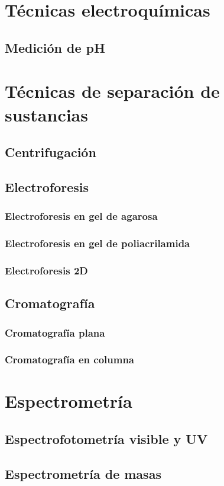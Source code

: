 \chapter{Técnicas electroquímicas}
\section{Medición de pH}
\chapter{Técnicas de separación de sustancias}
\section{Centrifugación}
\section{Electroforesis}
\subsection{Electroforesis en gel de agarosa}
\subsection{Electroforesis en gel de poliacrilamida}
\subsection{Electroforesis 2D}
\section{Cromatografía}
\subsection{Cromatografía plana}
\subsection{Cromatografía en columna}
\chapter{Espectrometría}
\section{Espectrofotometría visible y UV}
\section{Espectrometría de masas}
